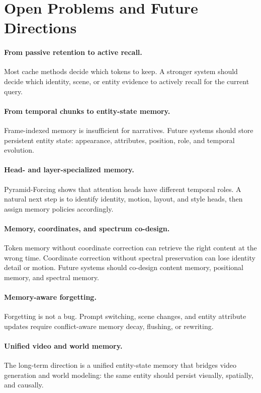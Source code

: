 \section{Open Problems and Future Directions}

\paragraph{From passive retention to active recall.} Most cache methods decide which tokens to keep. A stronger system should decide which identity, scene, or entity evidence to actively recall for the current query.

\paragraph{From temporal chunks to entity-state memory.} Frame-indexed memory is insufficient for narratives. Future systems should store persistent entity state: appearance, attributes, position, role, and temporal evolution.

\paragraph{Head- and layer-specialized memory.} Pyramid-Forcing shows that attention heads have different temporal roles. A natural next step is to identify identity, motion, layout, and style heads, then assign memory policies accordingly.

\paragraph{Memory, coordinates, and spectrum co-design.} Token memory without coordinate correction can retrieve the right content at the wrong time. Coordinate correction without spectral preservation can lose identity detail or motion. Future systems should co-design content memory, positional memory, and spectral memory.

\paragraph{Memory-aware forgetting.} Forgetting is not a bug. Prompt switching, scene changes, and entity attribute updates require conflict-aware memory decay, flushing, or rewriting.

\paragraph{Unified video and world memory.} The long-term direction is a unified entity-state memory that bridges video generation and world modeling: the same entity should persist visually, spatially, and causally.
